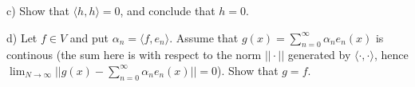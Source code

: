 \documentclass[12pt,letterpaper]{article}
\begin{document}
c) Show that $\langle h,h \rangle = 0$, and conclude that $h=0$.
\\
\noindent\fbox{
    \parbox{\textwidth}{
 	\noindent \\
	
		
    }
}

d) Let $f\in V$ and put $\alpha_n = \langle f, e_n \rangle$. Assume that $g(x) = \sum_{n=0}^\infty \alpha_n e_n(x)$ is continous (the sum here is with respect to the norm $|| \cdot ||$ generated by $\langle \cdot, \cdot \rangle$, hence $\lim_{N\to\infty} ||g(x)-\sum_{n=0}^\infty \alpha_n e_n(x)|| = 0$). Show that $g=f$.
\end{document}
